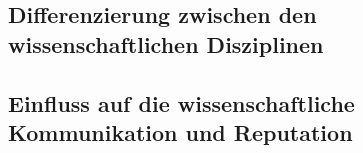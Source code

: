 \subsection{Differenzierung zwischen den wissenschaftlichen Disziplinen}
\subsection{Einfluss auf die wissenschaftliche Kommunikation und Reputation}
